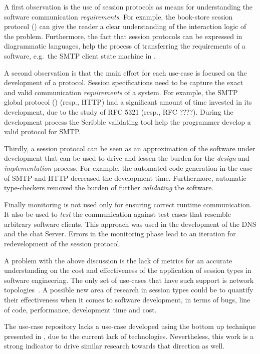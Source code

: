 A first observation is the use of session protocols
as means for understanding the software communication
{\em requirements}. For example, the book-store
session protocol () can give
the reader a clear understanding of the interaction logic of
the problem. Furthermore, the fact that session protocols
can be expressed in diagrammatic languages, help
the process of transferring the requirements of a software,
e.g.~the SMTP client state machine in .

A second observation is that the main effort for each use-case
is focused on the development of a protocol.
Session specifications need to be capture the exact
and valid communication {\em requirements} of a system.
For example, the SMTP global protocol () (resp., HTTP)
had a significant amount of time invested in its development,
due to the study of RFC 5321 (resp., RFC ????).
During the development process the Scribble validating tool
help the programmer develop a valid protocol for SMTP.

Thirdly, a session protocol can be seen as an approximation
of the software under development that can be used to drive
and lessen the burden for the {\em design} and {\em implementation} process.
For example, the automated code generation in the case of
SMTP and HTTP decreased the development time. Furthermore,
automatic type-checkers removed the burden of further
{\em validating} the software.

Finally monitoring is not used only for ensuring
correct runtime communication.
It also be used to {\em test} the communication
against test cases that resemble arbitrary software clients.
This approach was used in the development of the DNS and
the chat Server. Errors in the monitoring phase
lead to an iteration for redevelopment of the session protocol.

A problem with the above discussion is the lack of metrics
for an accurate understanding on the cost and effectiveness
of the application of session types in software engineering.
The only set of use-cases that have such support is network
topologies~\cite{NCY2015}.
A possible new area of research in session types could
be to quantify their effectiveness when it comes to software development,
in terms of bugs, line of code, performance, development time and cost.

The use-case repository lacks a use-case developed using the
bottom up technique presented in , due to
the current lack of technologies. Nevertheless, this work
is a strong indicator to drive similar research towards
that direction as well.

